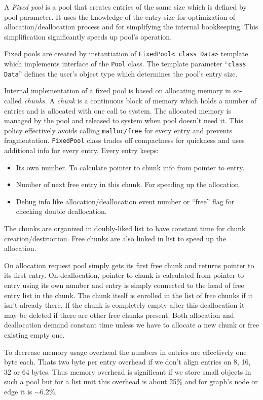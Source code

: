 \documentclass[11pt,twoside,a4paper]{article}
\begin{document}
A \emph{Fixed pool} is a pool that creates entries of the same size which is defined by pool parameter. It uses the knowledge of the entry-size for optimization of allocation/deallocation process and for simplifying the internal bookkeeping. This simplification significantly speeds up pool's operation.

Fixed pools are created by instantiation of \lstinline{FixedPool< class Data>} template which implements interface of the \lstinline{Pool} class. The template parameter ``\lstinline{class Data}'' defines the user's object type which determines the pool's entry size.

Internal implementation of a fixed pool is based on allocating memory in so-called \emph{chunks}. A \emph{chunk} is a continuous block of memory which holds a number of entries and is allocated with one call to system. The allocated memory is managed by the pool and released to system when pool doesn't need it. This policy effectively avoids calling \lstinline{malloc/free} for every entry and prevents fragmentation. \lstinline{FixedPool} class trades off compactness for quickness and uses additional info for every entry. Every entry keeps:
\begin{itemize}
\item Its own number. To calculate pointer to chunk info from pointer to entry.
\item Number of next free entry in this chunk. For speeding up the allocation.
\item Debug info like allocation/deallocation event number or ``free'' flag for checking double deallocation.
\end{itemize}
The chunks are organized in doubly-liked list to have constant time for chunk creation/destruction. Free chunks are also linked in list to speed up the allocation. 

On allocation request pool simply gets its first free chunk and returns pointer to its first entry. On deallocation, pointer to chunk is calculated from pointer to entry using its own number and entry is simply connected to the head of free entry list in the chunk. The chunk itself is enrolled in the list of free chunks if it isn't already there. If the chunk is completely empty after this deallocation it may be deleted if there are other free chunks present. Both allocation and deallocation demand constant time unless we have to allocate a new chunk or free existing empty one.

To decrease memory usage overhead the numbers in entries are effectively one byte each. Thats two byte per entry overhead if we don't align entries on 8, 16, 32 or 64 bytes. Thus memory overhead is significant if we store small objects in such a pool but for a list unit this overhead is about 25\% and for graph's node or edge it is $\sim$6.2\%.
\end{document}
